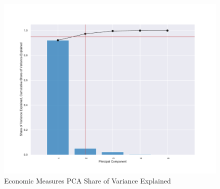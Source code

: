 \documentclass[10pt]{article}
\begin{document}
        \begin{figure}[H]
            \centering
            \caption{Economic Measures PCA Share of Variance Explained}
            \label{Econ_Share_Explained}	
            \includegraphics[width=\linewidth,keepaspectratio=true]{../Output/Figures/Econ_Indicator_Share_Explained_wb_only_short.pdf}
        \end{figure}
\end{document}
